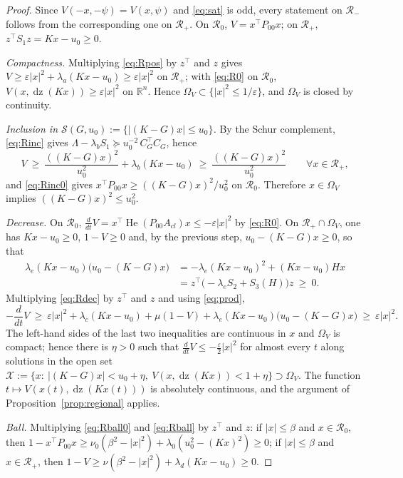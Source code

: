 \documentclass[preprint,12pt,authoryear]{elsarticle}
\theoremstyle{definition}
\theoremstyle{remark}
\newcommand{\R}{\mathbb{R}}
\newcommand{\tr}{^{\top}}
\newcommand{\dz}{\operatorname{dz}}
\DeclareMathOperator{\He}{He}
\begin{document}
\begin{proof}
Since $V(-x,-\psi)=V(x,\psi)$ and \eqref{eq:sat} is odd, every statement on $\mathcal R_-$ follows from the corresponding one on $\mathcal R_+$. On $\mathcal R_0$, $V=x\tr P_{00}x$; on $\mathcal R_+$, $z\tr S_1z=Kx-u_0\ge0$.

\emph{Compactness.} Multiplying \eqref{eq:Rpos} by $z\tr$ and $z$ gives $V\ge\varepsilon|x|^2+\lambda_a(Kx-u_0)\ge\varepsilon|x|^2$ on $\mathcal R_+$; with \eqref{eq:R0} on $\mathcal R_0$, $V(x,\dz(Kx))\ge\varepsilon|x|^2$ on $\R^n$. Hence $\Omega_V\subset\{|x|^2\le1/\varepsilon\}$, and $\Omega_V$ is closed by continuity.

\emph{Inclusion in $\mathcal S(G,u_0):=\{|(K-G)x|\le u_0\}$.} By the Schur complement, \eqref{eq:Rinc} gives $\Lambda-\lambda_bS_1\succeq u_0^{-2}\,C_G\tr C_G$, hence
\begin{equation}
V\ \ge\ \frac{((K-G)x)^2}{u_0^2}+\lambda_b(Kx-u_0)\ \ge\ \frac{((K-G)x)^2}{u_0^2}\qquad\forall x\in\mathcal R_+ ,
\end{equation}
and \eqref{eq:Rinc0} gives $x\tr P_{00}x\ge((K-G)x)^2/u_0^2$ on $\mathcal R_0$. Therefore $x\in\Omega_V$ implies $((K-G)x)^2\le u_0^2$.

\emph{Decrease.} On $\mathcal R_0$, $\frac{d}{dt}V=x\tr\He(P_{00}A_{cl})x\le-\varepsilon|x|^2$ by \eqref{eq:R0}. On $\mathcal R_+\cap\Omega_V$, one has $Kx-u_0\ge0$, $1-V\ge0$ and, by the previous step, $u_0-(K-G)x\ge0$, so that
\begin{align}\label{eq:prod}
\lambda_e(Kx-u_0)\big(u_0-(K-G)x\big)&=-\lambda_e(Kx-u_0)^2+(Kx-u_0)Hx\nonumber\\
&=z\tr\big(-\lambda_eS_2+S_3(H)\big)z\ \ge\ 0 .
\end{align}
Multiplying \eqref{eq:Rdec} by $z\tr$ and $z$ and using \eqref{eq:prod},
\begin{equation}
-\frac{d}{dt}V\ \ge\ \varepsilon|x|^2+\lambda_c(Kx-u_0)+\mu(1-V)+\lambda_e(Kx-u_0)\big(u_0-(K-G)x\big)\ \ge\ \varepsilon|x|^2 .
\end{equation}
The left-hand sides of the last two inequalities are continuous in $x$ and $\Omega_V$ is compact; hence there is $\eta>0$ such that $\frac{d}{dt}V\le-\frac{\varepsilon}{2}|x|^2$ for almost every $t$ along solutions in the open set $\mathcal X:=\{x:\ |(K-G)x|<u_0+\eta,\ V(x,\dz(Kx))<1+\eta\}\supset\Omega_V$. The function $t\mapsto V(x(t),\dz(Kx(t)))$ is absolutely continuous, and the argument of Proposition~\ref{prop:regional} applies.

\emph{Ball.} Multiplying \eqref{eq:Rball0} and \eqref{eq:Rball} by $z\tr$ and $z$: if $|x|\le\beta$ and $x\in\mathcal R_0$, then $1-x\tr P_{00}x\ge\nu_0(\beta^2-|x|^2)+\lambda_0(u_0^2-(Kx)^2)\ge0$; if $|x|\le\beta$ and $x\in\mathcal R_+$, then $1-V\ge\nu(\beta^2-|x|^2)+\lambda_d(Kx-u_0)\ge0$.
\end{proof}
\end{document}
